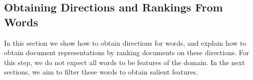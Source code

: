 


\subsection{Obtaining Directions and Rankings From Words}

In this section we show how to obtain directions for words, and explain how to obtain document representations by ranking documents on these directions. For this step, we do not expect all words to be features of the domain.  In the next sections, we aim to filter these words to obtain salient features.


